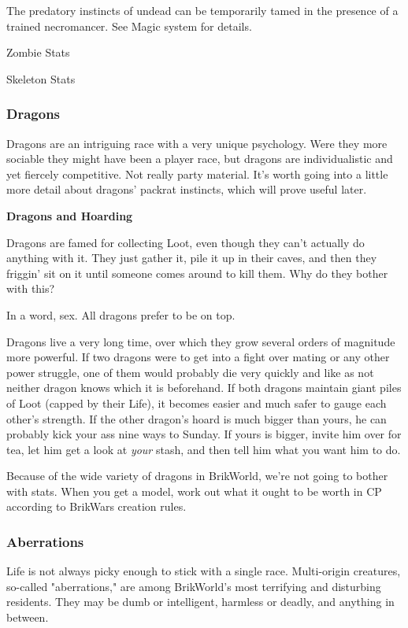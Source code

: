 \documentclass[12pt,a4paper,twocolumn]{article}
\begin{document}
The predatory instincts of undead can be temporarily tamed in the presence of a trained necromancer.  See Magic system for details.

Zombie Stats

Skeleton Stats

\subsubsection{Dragons}

Dragons are an intriguing race with a very unique psychology.  Were they more sociable they might have been a player race, but dragons are individualistic and yet fiercely competitive.  Not really party material.  It's worth going into a little more detail about dragons' packrat instincts, which will prove useful later.

{\bf Dragons and Hoarding}

Dragons are famed for collecting Loot, even though they can't actually do anything with it.  They just gather it, pile it up in their caves, and then they friggin' sit on it until someone comes around to kill them.  Why do they bother with this?

In a word, sex.  All dragons prefer to be on top.

Dragons live a very long time, over which they grow several orders of magnitude more powerful.  If two dragons were to get into a fight over mating or any other power struggle, one of them would probably die very quickly and like as not neither dragon knows which it is beforehand.  If both dragons maintain giant piles of Loot (capped by their Life), it becomes easier and much safer to gauge each other's strength.  If the other dragon's hoard is much bigger than yours, he can probably kick your ass nine ways to Sunday.  If yours is bigger, invite him over for tea, let him get a look at {\it your} stash, and then tell him what you want him to do.

Because of the wide variety of dragons in BrikWorld, we're not going to bother with stats.  When you get a model, work out what it ought to be worth in CP according to BrikWars creation rules.

\subsubsection{Aberrations}

Life is not always picky enough to stick with a single race.  Multi-origin creatures, so-called "aberrations," are among BrikWorld's most terrifying and disturbing residents.  They may be dumb or intelligent, harmless or deadly, and anything in between.
\end{document}
